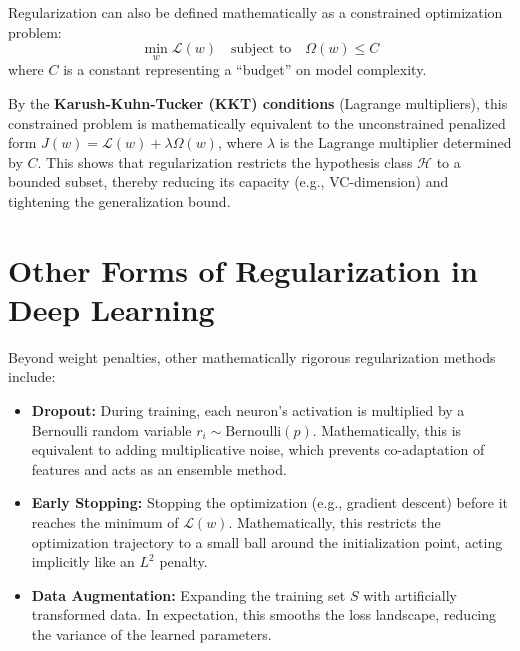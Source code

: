 \documentclass[11pt]{article}
\begin{document}
Regularization can also be defined mathematically as a constrained optimization problem:
\[
 \min_w \mathcal{L}(w) \quad \text{subject to} \quad \Omega(w) \le C 
\]
where \(C\) is a constant representing a ``budget'' on model complexity. 

By the \textbf{Karush-Kuhn-Tucker (KKT) conditions} (Lagrange multipliers), this constrained problem is mathematically equivalent to the unconstrained penalized form \(J(w) = \mathcal{L}(w) + \lambda \Omega(w)\), where \(\lambda\) is the Lagrange multiplier determined by \(C\). This shows that regularization restricts the hypothesis class \(\mathcal{H}\) to a bounded subset, thereby reducing its capacity (e.g., VC-dimension) and tightening the generalization bound.

\hrulefill

\section{Other Forms of Regularization in Deep Learning}

Beyond weight penalties, other mathematically rigorous regularization methods include:

\begin{itemize}
    \item \textbf{Dropout:} During training, each neuron's activation is multiplied by a Bernoulli random variable \(r_i \sim \text{Bernoulli}(p)\). Mathematically, this is equivalent to adding multiplicative noise, which prevents co-adaptation of features and acts as an ensemble method.
    \item \textbf{Early Stopping:} Stopping the optimization (e.g., gradient descent) before it reaches the minimum of \(\mathcal{L}(w)\). Mathematically, this restricts the optimization trajectory to a small ball around the initialization point, acting implicitly like an \(L^2\) penalty.
    \item \textbf{Data Augmentation:} Expanding the training set \(S\) with artificially transformed data. In expectation, this smooths the loss landscape, reducing the variance of the learned parameters.
\end{itemize}
\end{document}

